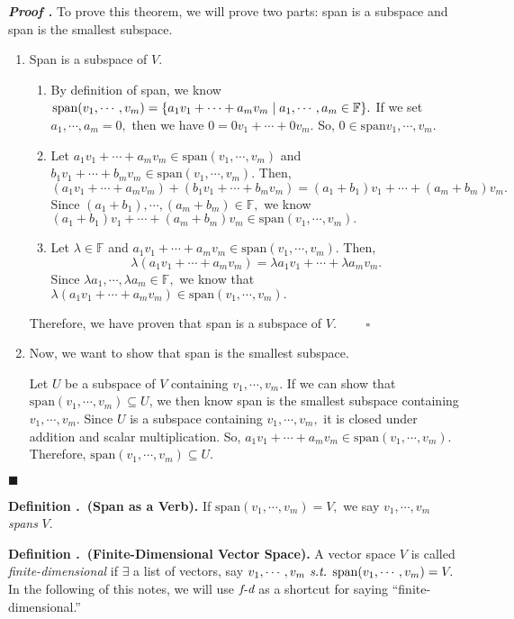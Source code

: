 \documentclass[11pt, letterpaper]{article}
\newcounter{index}[subsection]
\newenvironment*{df}[1]{\par\noindent\textbf{Definition \thesubsection.\stepcounter{index}\theindex\ (#1).}}{\par}
\newcounter{nprf}[subsection]
\newenvironment*{prf}{\par\indent\textbf{\textit{Proof \stepcounter{nprf}\thenprf.}}}{\hfill$\blacksquare$\par}
\def\F{\mathbb{F}}
\def\st{\emph{ s.t. }}
\def\FD{\emph{f-d}}
\def\span{\mathrm{span}}
\begin{document}
\begin{prf}
	To prove this theorem, we will prove two parts: span is a subspace and span is the smallest subspace. 
	\begin{enumerate}	
		\item Span is a subspace of $V$.
		\begin{enumerate}
			\item By definition of span, we know $\span(v_1,\cdots,v_m)=\qty{a_1v_1+\cdots+a_mv_m\mid a_1,\cdots,a_m\in\F}.$ If we set $a_1,\cdots,a_m=0,$ then we have $0=0v_1+\cdots+0v_m.$ So, $0\in\span{v_1,\cdots,v_m}.$
			\item Let $a_1v_1+\cdots+a_mv_m\in\span(v_1,\cdots,v_m)$ and $b_1v_1+\cdots+b_mv_m\in\span(v_1,\cdots,v_m).$ Then, \[(a_1v_1+\cdots+a_mv_m)+(b_1v_1+\cdots+b_mv_m)=(a_1+b_1)v_1+\cdots+(a_m+b_m)v_m.\] Since $(a_1+b_1),\cdots,(a_m+b_m)\in\F,$ we know $(a_1+b_1)v_1+\cdots+(a_m+b_m)v_m\in\span(v_1,\cdots,v_m).$
			\item Let $\lambda\in\F$ and $a_1v_1+\cdots+a_mv_m\in\span(v_1,\cdots,v_m)$. Then, \[\lambda(a_1v_1+\cdots+a_mv_m)=\lambda a_1v_1+\cdots+\lambda a_mv_m.\] Since $\lambda a_1,\cdots,\lambda a_m\in\F,$ we know that $\lambda(a_1v_1+\cdots+a_mv_m)\in\span(v_1,\cdots,v_m).$
		\end{enumerate}
		Therefore, we have proven that span is a subspace of $V$. $\qquad\square$
		\item Now, we want to show that span is the smallest subspace.\par Let $U$ be a subspace of $V$ containing $v_1,\cdots,v_m$. If we can  show that $\span(v_1,\cdots,v_m)\subseteq U$, we then know span is the smallest subspace containing $v_1,\cdots,v_m.$ Since $U$ is a subspace containing $v_1,\cdots,v_m,$ it is closed under addition and scalar multiplication. So, $a_1v_1+\cdots+a_mv_m\in\span(v_1,\cdots,v_m).$ Therefore, $\span(v_1,\cdots,v_m)\subseteq U.$
	\end{enumerate}	
\end{prf}
\begin{df}{Span as a Verb}
	If $\span(v_1,\cdots,v_m)=V,$ we say $v_1,\cdots,v_m$ \textit{spans} $V$.
\end{df}
\begin{df}{Finite-Dimensional Vector Space}
	A vector space $V$ is called \textit{finite-dimensional} if $\exists$ a list of vectors, say $v_1,\cdots,v_m\st\span(v_1,\cdots,v_m)=V.$ In the following of this notes, we will use $\FD$ as a shortcut for saying ``finite-dimensional.''
\end{df}
\end{document}

